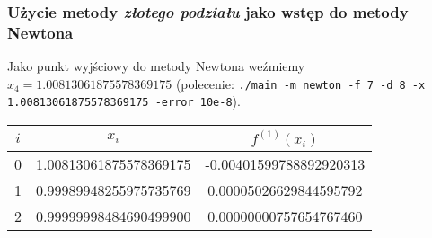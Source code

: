 \documentclass[a4paper,11pt]{article}
\begin{document}
    
    \subsubsection{Użycie metody \emph{złotego podziału} jako wstęp do metody Newtona}
    Jako punkt wyjściowy do metody Newtona weźmiemy $ x_4 = 1.00813061875578369175 $ (polecenie: \texttt{./main -m newton -f 7 -d 8 -x 1.00813061875578369175 -error 10e-8}).
    \begin{center}
      \begin{tabular}{S[table-format=1.0]S[table-format=-1.9]S[table-format=-1.15,table-auto-round=false]}
        \toprule
        {$i$}                & {$x_i$}               & {$f^{(1)}(x_i)$}            \\  & 1.00813061875578369175 & -0.00401599788892920313 \\
          1 & 0.99989948255975735769 & 0.00005026629844595792 \\
          2 & 0.99999998484690499900 & 0.00000000757654767460 \\ \bottomrule
        \end{tabular}
    \end{center} 
    
\end{document}
